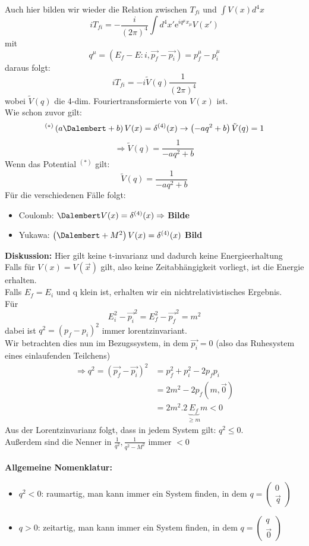 Auch hier bilden wir wieder die Relation zwischen $T_{fi}$ und $\int V(x) d^4x$ 
\\
\[ iT_{fi} = - \frac{i}{(2\pi)^4} \int d^4x' \mathrm{e}^{iq^{\mu} x_{\mu }} 
V(x') \]
mit 
\[ q^{\mu} = \left( E_f - E:i, \vec{p_f} - \vec{p_i} \right) = p_f^{\mu} - 
p_i^{\mu} \]
daraus folgt:
\[ i T_{fi} = -i \tilde{V}(q) \frac{1}{(2\pi)^4} \] 
wobei $\tilde{V}(q)$ die 4-dim. Fouriertransformierte von $V(x)$ ist. \\
Wie schon zuvor gilt: 
\[ ^{(*)} \left( a \Dalembert + b \right) V(x) = \delta^{(4)} (x) \to \left( 
-aq^2 + b \right) \tilde{V}(q) = 1 \]
\[ \Rightarrow \tilde{V}(q) = \frac{1}{-aq^2 + b} \]
Wenn das Potential $^{(*)}$ gilt: 
\[ \tilde{V}(q) = \frac{1}{- aq^2 + b} \]
Für die verschiedenen Fälle folgt: 
\begin{itemize}
	\item Coulomb: $\Dalembert V(x) = \delta^{(4)} (x) \Rightarrow$ 
	\textbf{Bilde}
	\item Yukawa: $\left( \Dalembert + M^2 \right) V(x) = \delta^{(4)} (x)$ 
	\textbf{Bild}
\end{itemize}
\textbf{Diskussion:} Hier gilt keine t-invarianz und dadurch keine 
Energieerhaltung \\
Falls für $V(x) = V(\vec{x})$ gilt, also keine Zeitabhängigkeit vorliegt, ist 
die Energie erhalten. \\
Falls $E_f = E_i$ und q klein ist, erhalten wir ein nichtrelativistisches 
Ergebnis. \\
Für \[ E_i^2 - \vec{p_i}^2 = E_f^2 - \vec{p_f}^2 = m^2 \]
dabei ist $ q^2 = (p_f - p_i)^2 $ immer lorentzinvariant. \\
Wir betrachten dies nun im Bezugssystem, in dem $\vec{p_i} = 0$ (also das 
Ruhesystem eines einlaufenden Teilchens)
\begin{align*}
\Rightarrow q^2 = (\vec{p_f}- \vec{p_i})^2 &= p_f^2 + p_i^2 - 2p_f p_i \\
&= 2m^2 - 2p_f (m,\vec{0}) \\
&= 2m^2 . 2 \underbrace{E_f}_{\ge m} m < 0  
\end{align*}
Aus der Lorentzinvarianz folgt, dass in jedem System gilt: $q^2 \le 0$. \\
Außerdem sind die Nenner in $\frac{1}{q^2}, \frac{1}{q^2 - M^2}$ immer $<0$ \\
\\
\textbf{Allgemeine Nomenklatur:} 
\begin{itemize}
	\item $q^2 <0$: raumartig, man kann immer ein System finden, in dem $q = 
	\begin{pmatrix}
	0 \\
	\vec{q}
	\end{pmatrix} $
    \item $q > 0$: zeitartig, man kann immer ein System finden, in dem $q = 
    \begin{pmatrix}
    q \\
    \vec{0}
    \end{pmatrix} $
\end{itemize}

